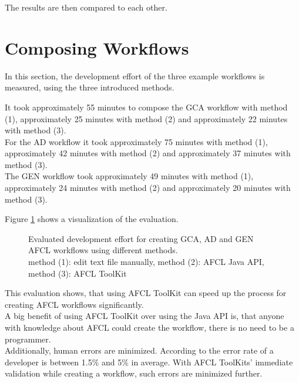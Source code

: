 \documentclass[a4paper,top=25mm,bottom=25mm,12pt,pdftex,halfparskip,twoside,bibtotoc,numbers=noenddot]{scrbook}
\begin{document}
The results are then compared to each other.

\section{Composing Workflows}
\label{sec:evaluation-composing}

In this section, the development effort of the three example workflows is measured, using the three introduced methods.

It took approximately 55 minutes to compose the GCA workflow with method (1), approximately 25 minutes with method (2) and approximately 22 minutes with method (3).\\
For the AD workflow it took approximately 75 minutes with method (1), approximately 42 minutes with method (2) and approximately 37 minutes with method (3).\\
The GEN workflow took approximately 49 minutes with method (1), approximately 24 minutes with method (2) and approximately 20 minutes with method (3).

Figure \ref{fig:evaluation-composing} shows a visualization of the evaluation.

\begin{figure}[h]
\caption{Evaluated development effort for creating GCA, AD and GEN AFCL workflows using different methods.\\ \small{method (1): edit text file manually, method (2): AFCL Java API, method (3): AFCL ToolKit}}
\label{fig:evaluation-composing}
\end{figure}

This evaluation shows, that using AFCL ToolKit can speed up the process for creating AFCL workflows significantly.\\
A big benefit of using AFCL ToolKit over using the Java API is, that anyone with knowledge about AFCL could create the workflow, there is no need to be a programmer.\\
Additionally, human errors are minimized. According to \cite{books-code-complete-mcconnell} the error rate of a developer is between 1.5\% and 5\% in average.
With AFCL ToolKits' immediate validation while creating a workflow, such errors are minimized further. 
\end{document}
